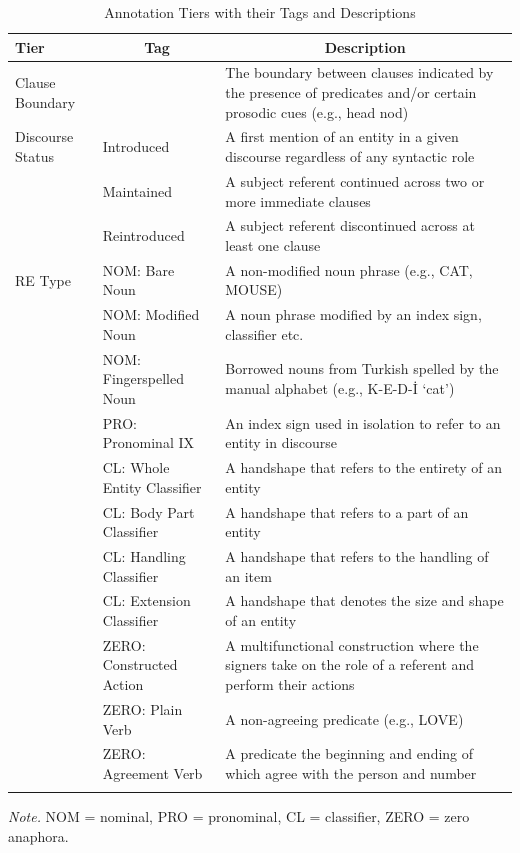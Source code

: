 \documentclass[review]{elsarticle} %
\begin{document}
\begin{table}[p]

\begin{center}
\begin{threeparttable}

\caption{\label{tab:tab-2}Annotation Tiers with their Tags and Descriptions}

\footnotesize{

\begin{tabular}{p{3.2cm}p{3.8cm}p{3.8cm}}
\toprule
Tier & \multicolumn{1}{c}{Tag} & \multicolumn{1}{c}{Description}\\
\midrule
Clause Boundary &  & The boundary between clauses indicated by the presence of predicates and/or certain prosodic cues (e.g., head nod)\\
Discourse Status & Introduced & A first mention of an entity in a given discourse regardless of any syntactic role\\
 & Maintained & A subject referent continued across two or more immediate clauses\\
 & Reintroduced & A subject referent discontinued across at least one clause\\
RE Type & NOM: Bare Noun & A non-modified noun phrase (e.g., CAT, MOUSE)\\
 & NOM: Modified Noun & A noun phrase modified by an index sign, classifier etc.\\
 & NOM: Fingerspelled Noun & Borrowed nouns from Turkish spelled by the manual alphabet (e.g., K-E-D-İ ‘cat’)\\
 & PRO: Pronominal IX & An index sign used in isolation to refer to an entity in discourse\\
 & CL: Whole Entity Classifier & A handshape that refers to the entirety of an entity\\
 & CL: Body Part Classifier & A handshape that refers to a part of an entity\\
 & CL: Handling Classifier & A handshape that refers to the handling of an item\\
 & CL: Extension Classifier & A handshape that denotes the size and shape of an entity\\
 & ZERO: Constructed Action & A multifunctional construction where the signers take on the role of a referent and perform their actions\\
 & ZERO: Plain Verb & A non-agreeing predicate (e.g., LOVE)\\
 & ZERO: Agreement Verb & A predicate the beginning and ending of which agree with the person and number\\
\bottomrule
\addlinespace
\end{tabular}

}

\begin{tablenotes}[para]
\normalsize{\textit{Note.} NOM = nominal, PRO = pronominal, CL = classifier, ZERO = zero anaphora.}
\end{tablenotes}

\end{threeparttable}
\end{center}

\end{table}
\end{document}
